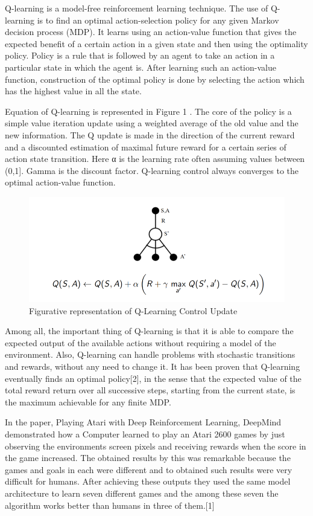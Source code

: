 \documentclass{article}
\begin{document}
Q-learning is a model-free reinforcement learning technique. The use of Q- learning is to find an optimal action-selection policy for any given Markov decision process (MDP). It learns using an action-value function that gives the expected benefit of a certain action in a given state and then using the optimality policy. Policy is a rule that is followed by an agent to take an action in a particular state in which the agent is. After learning such an action-value function, construction of the optimal policy is done by selecting the action which has the highest value in all the state.

Equation of Q-learning is represented in Figure 1 . The core of the policy is a simple value iteration update using a weighted average of the old value and the new information. The Q update is made in the direction of the current reward and a discounted estimation of maximal future reward for a certain series of action state transition. Here α is the learning rate often assuming values between (0,1]. Gamma is the discount factor. Q-learning control always converges to the optimal action-value function.

\begin{figure}[H]
  \centering
      \includegraphics{f1}
  \caption{Figurative representation of Q-Learning Control Update}
\end{figure}

Among all, the important thing of Q-learning is that it is able to compare the expected output of the available actions without requiring a model of the environment. Also, Q-learning can handle problems with stochastic transitions and rewards, without any need to change it. It has been proven that Q-learning eventually finds an optimal policy[2], in the sense that the expected value of the total reward return over all successive steps, starting from the current state, is the maximum achievable for any finite MDP.

In the paper, Playing Atari with Deep Reinforcement Learning, DeepMind demonstrated how a Computer learned to play an Atari 2600 games by just observing the environments screen pixels and receiving rewards when the score in the game increased. The obtained results by this was remarkable because the games and goals in each were different and to obtained such results were very difficult for humans. After achieving these outputs they used the same model architecture to learn seven different games and the among these seven the algorithm works better than humans in three of them.[1]
\end{document}
